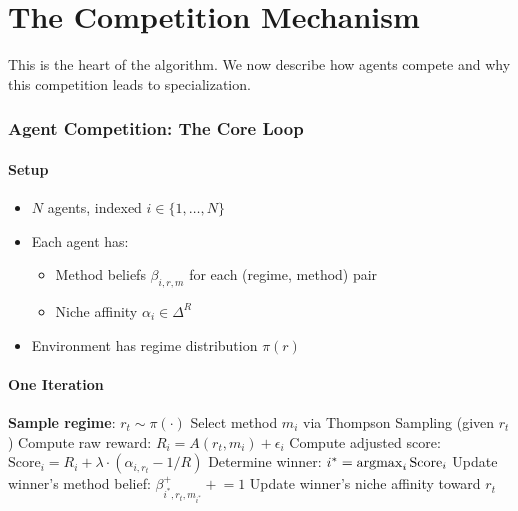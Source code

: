 \documentclass[11pt,a4paper]{article}
\theoremstyle{definition}
\theoremstyle{plain}
\newcommand{\argmax}{\operatornamewithlimits{argmax}}
\begin{document}
\newpage
\part{The Competition Mechanism}

This is the heart of the algorithm. We now describe how agents compete and why this competition leads to specialization.

\section{Agent Competition: The Core Loop}

\subsection{Setup}

\begin{itemize}
    \item $N$ agents, indexed $i \in \{1, \ldots, N\}$
    \item Each agent has:
    \begin{itemize}
        \item Method beliefs $\beta_{i,r,m}$ for each (regime, method) pair
        \item Niche affinity $\alpha_i \in \Delta^R$
    \end{itemize}
    \item Environment has regime distribution $\pi(r)$
\end{itemize}

\subsection{One Iteration}

\begin{algorithm}[H]
\caption{One Iteration of GAUSE}
\begin{algorithmic}[1]
\STATE \textbf{Sample regime}: $r_t \sim \pi(\cdot)$
    \STATE Select method $m_i$ via Thompson Sampling (given $r_t$)
    \STATE Compute raw reward: $R_i = A(r_t, m_i) + \epsilon_i$
    \STATE Compute adjusted score: $\text{Score}_i = R_i + \lambda \cdot (\alpha_{i,r_t} - 1/R)$
\ENDFOR
\STATE Determine winner: $i^* = \argmax_i \text{Score}_i$
\STATE Update winner's method belief: $\beta_{i^*,r_t,m_{i^*}}^+ \mathrel{+}= 1$
\STATE Update winner's niche affinity toward $r_t$
\end{algorithmic}
\end{algorithm}
\end{document}
